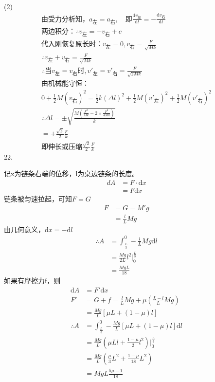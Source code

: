 \documentclass[a4paper,fleqn,twocolumn]{article}
\newcommand{\di}[1]{\mathrm{d}#1}
\newcommand{\dy}[2]{\frac{\di{#1}}{\di{#2}}}
\begin{document}
   		(2)
   		\begin{gather*}
   			\text{由受力分析知，}a_{\text{左}}=a_{\text{右}},\quad\text{即}\dy{v_{\text{左}}}{t}=-\dy{v_{\text{右}}}{t}\\
   			\text{两边积分：}\therefore v_{\text{左}}=-v_{\text{右}}+c\\
   			\text{代入刚恢复原长时：}v_{\text{左}}=0,v_{\text{右}}=\frac{F}{\sqrt{Mk}}\\
   			\therefore v_{\text{左}}+v_{\text{右}}=\frac{F}{\sqrt{Mk}}\\
   			\therefore\text{当}v_{\text{左}}=v_{\text{右}}\text{时},v'_{\text{左}}=v'_{\text{右}}=\frac{F}{\sqrt{2Mk}}\\
   			\text{由机械能守恒：}\\
   			0+\frac{1}{2}M(v_{\text{右}})^2=\frac{1}{2}k(\Delta l)^2+\frac{1}{2}M(v'_{\text{左}})^2+\frac{1}{2}M(v'_{\text{右}})^2\\
   			\therefore\Delta l=\pm\sqrt{\frac{M\left(\frac{F^2}{Mk}-2\times\frac{F^2}{4Mk}\right)}{k}}\\
   			=\pm\frac{\sqrt{2}}{2}\frac{F}{k}\\
   			\text{即伸长或压缩}\frac{\sqrt{2}}{2}\frac{F}{k}
   		\end{gather*}
   		22.\par 
   			记x为链条右端的位移，l为桌边链条的长度。
   			\begin{align*}
   				dA	&=F\cdot\di{x}\\
   					&=F\di{x}
   			\end{align*}
   			链条被匀速拉起，可知$F=G$
   			\begin{align*}
   				F	&=G=M'g\\
   					&=\frac{l}{L}Mg
   			\end{align*}
   			由几何意义，$\di{x}=-\di{l}$
   			\begin{align*}
	   			\therefore A&=\int_{\frac{L}{3}}^{0} -\frac{l}{L}Mg\di{l}\\
	   						&=\frac{Mg}{2L}l^2\left.\right|_{0}^{\frac{L}{3}}\\
	   						&=\frac{MgL}{18}
   			\end{align*}
   			如果有摩擦力f，则
   			\begin{align*}
	   			\di{A}	&=F'\di{x}\\
	   			F'		&=G+f=\frac{l}{L}Mg+\mu\left(\frac{L-l}{L}Mg\right)\\
	   					&=\frac{Mg}{L}[\mu L+(1-\mu)l]\\
	   			\therefore A&=\int_{\frac{L}{3}}^{0} -\frac{Mg}{L}[\mu L+(1-\mu)l] \di{l}\\
	   						&=\frac{Mg}{L}\left(\mu Ll+\frac{1-\mu}{2}l^2\right)\left.\right|_{0}^{\frac{L}{3}}\\
	   						&=\frac{Mg}{L}\left(\frac{\mu}{3}L^2+\frac{1-\mu}{18}L^2\right)\\
	   						&=MgL\frac{5\mu +1}{18}
   			\end{align*}
\end{document}
